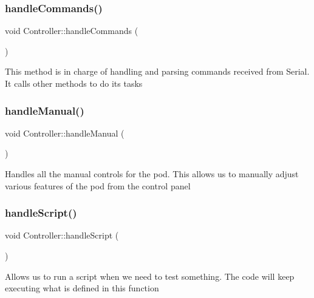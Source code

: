 \subsubsection{\texorpdfstring{handle\+Commands()}{handleCommands()}}
{\footnotesize\ttfamily void Controller\+::handle\+Commands (\begin{DoxyParamCaption}{ }\end{DoxyParamCaption})}

This method is in charge of handling and parsing commands received from Serial. It calls other methods to do it\textquotesingle{}s tasks \mbox{\label{class_controller_a28c18ac5bf6ca7f6ea6ac70ad42cb24d}} 
\subsubsection{\texorpdfstring{handle\+Manual()}{handleManual()}}
{\footnotesize\ttfamily void Controller\+::handle\+Manual (\begin{DoxyParamCaption}{ }\end{DoxyParamCaption})\hspace{0.3cm}{\ttfamily [private]}}

Handles all the manual controls for the pod. This allows us to manually adjust various features of the pod from the control panel \mbox{\label{class_controller_a472269f67c81e0300446310b68bbd2d3}} 
\subsubsection{\texorpdfstring{handle\+Script()}{handleScript()}}
{\footnotesize\ttfamily void Controller\+::handle\+Script (\begin{DoxyParamCaption}{ }\end{DoxyParamCaption})\hspace{0.3cm}{\ttfamily [private]}}

Allows us to run a script when we need to test something. The code will keep executing what is defined in this function \mbox{\label{class_controller_aadb7ac5a7709c9d18d7e0bcc67bde5db}} 
